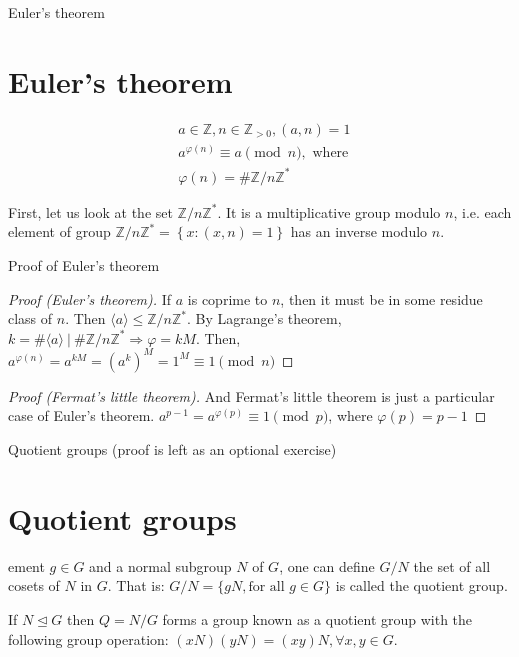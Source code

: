 \documentclass{beamer}
\begin{document}
\begin{frame}{Euler's theorem}
	\section{Euler's theorem}
	\begin{Theorem}
		\begin{align*}
			& a \in \mathbb{Z}, n \in \mathbb{Z}_{>0}, (a, n) = 1 \\
			& a^{\varphi(n)} \equiv a \pmod n, \text{ where } \\
			& \varphi(n) = \# \mathbb{Z} / n \mathbb{Z}^*
		\end{align*}
    \end{Theorem}
	First, let us look at the set $\mathbb{Z} / n \mathbb{Z}^*$. It is a multiplicative group modulo $n$, i.e. 
	each element of group $\mathbb{Z} / n \mathbb{Z}^* = \left\{ x : (x, n) = 1 \right\}$ has an inverse modulo $n$.
\end{frame}

\begin{frame}{Proof of Euler's theorem}
	\begin{proof}[Proof (Euler's theorem)]
		If $a$ is coprime to $n$, then it must be in some residue class of $n$. Then 
		$\langle a \rangle \le \mathbb{Z} / n \mathbb{Z}^*$. \newline
		By Lagrange's theorem, $k = \#\langle a \rangle \ | \ \#\mathbb{Z} / n \mathbb{Z}^* \Rightarrow \varphi = kM$. 
		\newline
		Then, $a^{\varphi(n)} = a^{kM} = (a^{k})^M = 1^M \equiv 1 \pmod n$ 
	\end{proof}
	\begin{proof}[Proof (Fermat's little theorem)]
		And Fermat's little theorem is just a particular case of Euler's theorem. \newline
		$a ^ {p - 1} = a ^ {\varphi(p)} \equiv 1 \pmod p$, where $\varphi(p) = p - 1$ 
	\end{proof}
\end{frame}

\begin{frame}{Quotient groups (proof is left as an optional exercise)}
	\section{Quotient groups}
	\begin{definition}ement $g \in G$ and a normal subgroup $N$ of $G$, one can define $G / N$ the set of 
		all cosets of $N$ in $G$. That is: $G / N = \{ gN, \text{for all } g \in G\}$ is called the quotient group.
	\end{definition}

	\begin{theorem}
		If $N \unlhd G$ then $Q = N/G$ forms a group known as a quotient group with the following group operation: 
		\newline
		$(xN)(yN) = (xy)N, \forall x, y \in G$.
	\end{theorem}
\end{frame}
\end{document}
